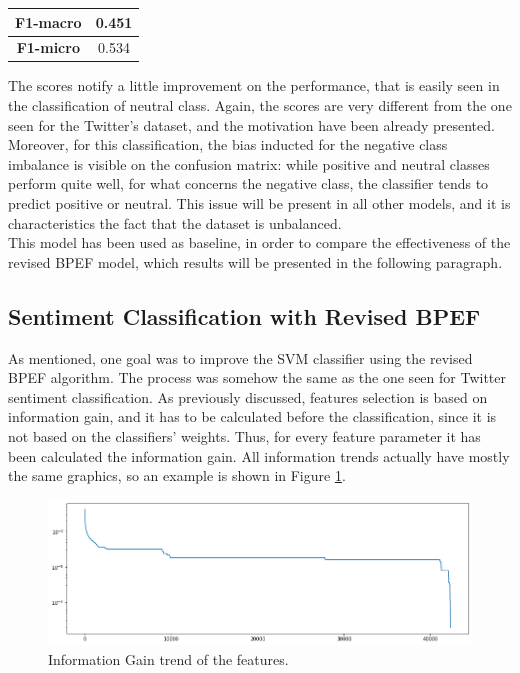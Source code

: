 \begin{center}
	\begin{tabular}{ | c | c | } 
		\hline
		\textbf{F1-macro} & 0.451 \\
		\hline
		\textbf{F1-micro} & 0.534 \\ 
		\hline
	\end{tabular}
\end{center}

The scores notify a little improvement on the performance, that is easily seen in the classification of neutral class. Again, the scores are very different from the one seen for the Twitter's dataset, and the motivation have been already presented. Moreover, for this classification, the bias inducted for the negative class imbalance is visible on the confusion matrix: while positive and neutral classes perform quite well, for what concerns the negative class, the classifier tends to predict positive or neutral. This issue will be present in all other models, and it is characteristics the fact that the dataset is unbalanced.\\
This model has been used as baseline, in order to compare the effectiveness of the revised BPEF model, which results will be presented in the following paragraph.

\subsection{Sentiment Classification with Revised BPEF}

As mentioned, one goal was to improve the SVM classifier using the revised BPEF algorithm. The process was somehow the same as the one seen for Twitter sentiment classification. As previously discussed, features selection is based on information gain, and it has to be calculated before the classification, since it is not based on the classifiers' weights. Thus, for every feature parameter it has been calculated the information gain. All information trends actually have mostly the same graphics, so an example is shown in Figure \ref{fig:ita_bpef_fs_1}.

\begin{figure}[H]
	\centering
	\includegraphics[width=\textwidth]{figures/conf_matrices/ita_snt_bpef/bpef_fs_1.png}
	\caption{Information Gain trend of the features.}
	\label{fig:ita_bpef_fs_1}
\end{figure}

